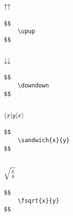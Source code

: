 \documentclass[a4paper]{article}
\begin{document}
\subsection{$ \uparrow \uparrow$}

\begin{verbatim}
$$
	\upup
$$
\end{verbatim}

\subsection{$ \downarrow \downarrow$}

\begin{verbatim}
$$
	\downdown
$$
\end{verbatim}

\subsection{$  \langle x| y  |x\rangle$}

\begin{verbatim}
$$
	\sandwich{x}{y}
$$
\end{verbatim}

\subsection{$ \sqrt{\frac{x}{y}}$}

\begin{verbatim}
$$
	\fsqrt{x}{y}
$$
\end{verbatim}
\end{document}
